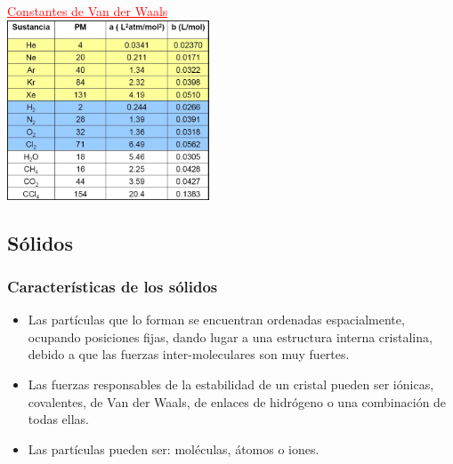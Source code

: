             \begin{center} \textcolor{red}{\underline{Constantes de Van der Waals}}\\[5pt] \includegraphics[width=6cm]{./imagenes/constantesVannDerWaals.png} \end{center}
    \subsection{Sólidos}
        \subsubsection{Características de los sólidos}
            \begin{itemize}
                \item Las partículas que lo forman se encuentran ordenadas espacialmente, ocupando posiciones fijas, dando lugar a una estructura interna cristalina, debido a que las fuerzas inter-moleculares son muy fuertes.
                \item Las fuerzas responsables de la estabilidad de un cristal pueden ser iónicas, covalentes, de Van der Waals, de enlaces de hidrógeno o una combinación de todas ellas.
                \item Las partículas pueden ser: moléculas, átomos o iones.
            \end{itemize}
